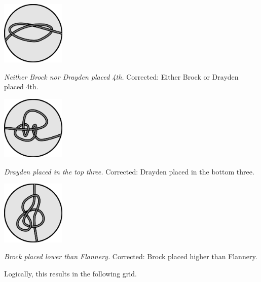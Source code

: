 \begin{multicols}{3}\footnotesize
  \begin{center}
    \includegraphics[width=1.2in]{assets/knot1.pdf}

    \textit{Neither Brock nor Drayden placed 4th.}
    Corrected: Either Brock or Drayden placed 4th.


    \includegraphics[width=1.2in]{assets/knot2.pdf}

    \textit{Drayden placed in the top three.}
    Corrected: Drayden placed in the bottom three.


    \includegraphics[width=1.2in]{assets/knot3.pdf}

    \textit{Brock placed lower than Flannery.}
    Corrected: Brock placed higher than Flannery.
  \end{center}
\end{multicols}

Logically, this results in the following grid.

